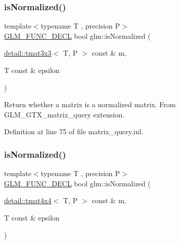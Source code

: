 \mbox{\label{group__gtx__matrix__query_gab4c4106cd851951bad5e78a83bfc75dd}} 
\subsubsection{\texorpdfstring{is\+Normalized()}{isNormalized()}\hspace{0.1cm}{\footnotesize\ttfamily [2/3]}}
{\footnotesize\ttfamily template$<$typename T , precision P$>$ \\
\hyperlink{setup_8hpp_ab2d052de21a70539923e9bcbf6e83a51}{G\+L\+M\+\_\+\+F\+U\+N\+C\+\_\+\+D\+E\+CL} bool glm\+::is\+Normalized (\begin{DoxyParamCaption}\item[{\hyperlink{structglm_1_1detail_1_1tmat3x3}{detail\+::tmat3x3}$<$ T, P $>$ const \&}]{m,  }\item[{T const \&}]{epsilon }\end{DoxyParamCaption})}

Return whether a matrix is a normalized matrix. From G\+L\+M\+\_\+\+G\+T\+X\+\_\+matrix\+\_\+query extension. 

Definition at line 75 of file matrix\+\_\+query.\+inl.

\mbox{\label{group__gtx__matrix__query_gad0ff11cc2c26d3086d9f88316a321637}} 
\subsubsection{\texorpdfstring{is\+Normalized()}{isNormalized()}\hspace{0.1cm}{\footnotesize\ttfamily [3/3]}}
{\footnotesize\ttfamily template$<$typename T , precision P$>$ \\
\hyperlink{setup_8hpp_ab2d052de21a70539923e9bcbf6e83a51}{G\+L\+M\+\_\+\+F\+U\+N\+C\+\_\+\+D\+E\+CL} bool glm\+::is\+Normalized (\begin{DoxyParamCaption}\item[{\hyperlink{structglm_1_1detail_1_1tmat4x4}{detail\+::tmat4x4}$<$ T, P $>$ const \&}]{m,  }\item[{T const \&}]{epsilon }\end{DoxyParamCaption})}

